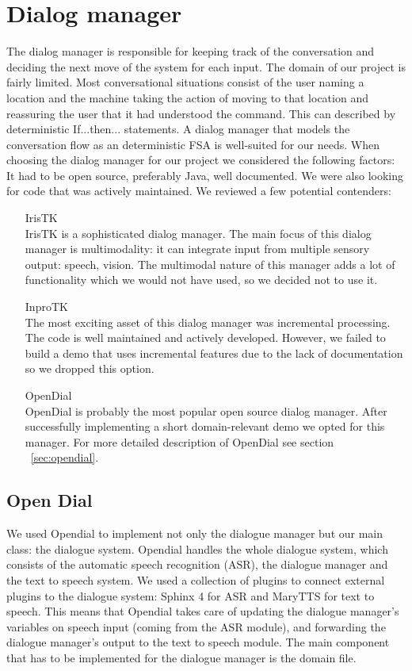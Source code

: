 \documentclass[a4paper, 12pt]{article}
\begin{document}
\section{Dialog manager}
The dialog manager is responsible for keeping track of the conversation and deciding the next move of the system for each input. The domain of our project is fairly limited. Most conversational situations consist of the user naming a location and the machine taking the action of moving to that location and reassuring the user that it had understood the command. This can described by deterministic If...then... statements. A dialog manager that models the conversation flow as an deterministic FSA is well-suited for our needs.
When choosing the dialog manager for our project we considered the following factors: It had to be open source, preferably Java, well documented.
We were also looking for code that was actively maintained.
We reviewed a few potential contenders:
\begin{itemize}
\item[IrisTK] \hfill \\
IrisTK is a sophisticated dialog manager. The main focus of this dialog manager is multimodality: it can integrate input from multiple sensory output: speech, vision. The multimodal nature of this manager adds a lot of functionality which we would not have used, so we decided not to use it.
\item[InproTK] \hfill \\
The most exciting asset of this dialog manager was incremental processing.
The code is well maintained and actively developed. 
However, we failed to build a demo that uses incremental features due to the lack of documentation so we dropped this option.
\item[OpenDial] \hfill \\
OpenDial is probably the most popular open source dialog manager.
After successfully implementing a short domain-relevant demo we opted for this manager.
For more detailed description of OpenDial see section ~\ref{sec:opendial}.
\end{itemize}

\subsection{Open Dial}

We used Opendial to implement not only the dialogue manager but our main class: the dialogue system. 
Opendial handles the whole dialogue system, which consists of the automatic speech recognition (ASR), the dialogue manager and the text to speech system. 
We used a collection of plugins to connect external plugins to the dialogue system: Sphinx 4 for ASR and MaryTTS for text to speech. 
This means that Opendial takes care of updating the dialogue manager's variables on speech input (coming from the ASR module), and forwarding the dialogue manager's output to the text to speech module. 
The main component that has to be implemented for the dialogue manager is the domain file. \\
\end{document}
